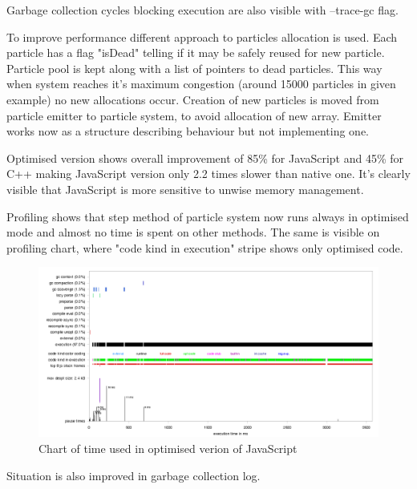 Garbage collection cycles blocking execution are also visible with --trace-gc flag.



To improve performance different approach to particles allocation is used. Each particle has a flag "isDead" telling if it may be safely reused for new particle. Particle pool is kept along with a list of pointers to dead particles. This way when system reaches it's maximum congestion (around 15000 particles in given example) no new allocations occur.
Creation of new particles is moved from particle emitter to particle system, to avoid allocation of new array. Emitter works now as a structure describing behaviour but not implementing one.




Optimised version shows overall improvement of 85\% for JavaScript and 45\% for C++ making JavaScript version only 2.2 times slower than native one. It's clearly visible that JavaScript is more sensitive to unwise memory management.



Profiling shows that step method of particle system now runs always in optimised mode and almost no time is spent on other methods. The same is visible on profiling chart, where "code kind in execution" stripe shows only optimised code.

\begin{figure}[h!]
  \caption{Chart of time used in optimised verion of JavaScript}
  \label{img:particles2profile}
  \centering
	\includegraphics[width=16cm]{particles/particles2-profile.png}
\end{figure} 

Situation is also improved in garbage collection log.


